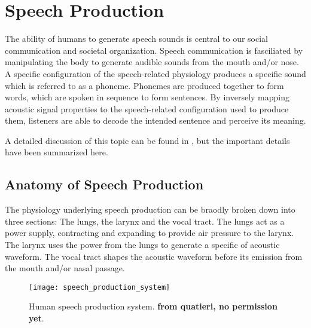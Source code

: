 \section{Speech Production}

The ability of humans to generate speech sounds is central to our social communication and societal organization. Speech communication is fasciliated by manipulating the body to generate audible sounds from the mouth and/or nose. A specific configuration of the speech-related physiology produces a specific sound which is referred to as a phoneme. Phonemes are produced together to form words, which are spoken in sequence to form sentences. By inversely mapping acoustic signal properties to the speech-related configuration used to produce them, listeners are able to decode the intended sentence and perceive its meaning.

A detailed discussion of this topic can be found in \cite{quatieri2002discrete}, but the important details have been summarized here.

\subsection{Anatomy of Speech Production}

The physiology underlying speech production can be braodly broken down into three sections: The lungs, the larynx and the vocal tract. The lungs act as a power supply, contracting and expanding to provide air pressure to the larynx. The larynx uses the power from the lungs to generate a specific of acoustic waveform. The vocal tract shapes the acoustic waveform before its emission from the mouth and/or nasal passage. 


\begin{figure}[H]
	\centering
	\texttt{[image: speech\_production\_system]}
	\caption[Human speech production system]{Human speech production system. \textbf{from quatieri, no permission yet}.}
	\label{fig:speech_production_system}
\end{figure}

